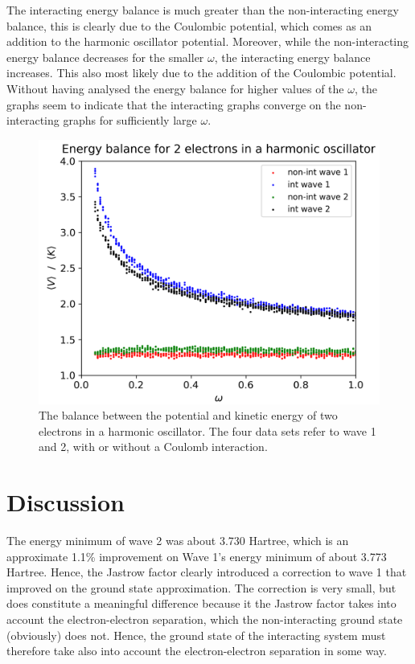\documentclass[nofootinbib,reprint,english]{revtex4-1}
\begin{document}
The interacting energy balance is much greater than the non-interacting energy balance, this is clearly due to the Coulombic potential, which comes as an addition to the harmonic oscillator potential. Moreover, while the non-interacting energy balance decreases for the smaller \(\omega\), the interacting energy balance increases. This also most likely due to the addition of the Coulombic potential. Without having analysed the energy balance for higher values of the \(\omega\), the graphs seem to indicate that the interacting graphs converge on the non-interacting graphs for sufficiently large \(\omega\).

\begin{figure}[h!]
\centering
\includegraphics[scale=0.5]{../results/virial/energy_balance_2.png}
\caption{The balance between the potential and kinetic energy of two electrons in a harmonic oscillator. The four data sets refer to wave 1 and 2, with or without a Coulomb interaction.}\label{fig:virial}
\end{figure}

\section{Discussion}
The energy minimum of wave 2 was about 3.730 Hartree, which is an approximate 1.1\% improvement on Wave 1's energy minimum of about 3.773 Hartree. Hence, the Jastrow factor clearly introduced a correction to wave 1 that improved on the ground state approximation. The correction is very small, but does constitute a meaningful difference because it the Jastrow factor takes into account the electron-electron separation, which the non-interacting ground state (obviously) does not. Hence, the ground state of the interacting system must therefore take also into account the electron-electron separation in some way.
\end{document}
